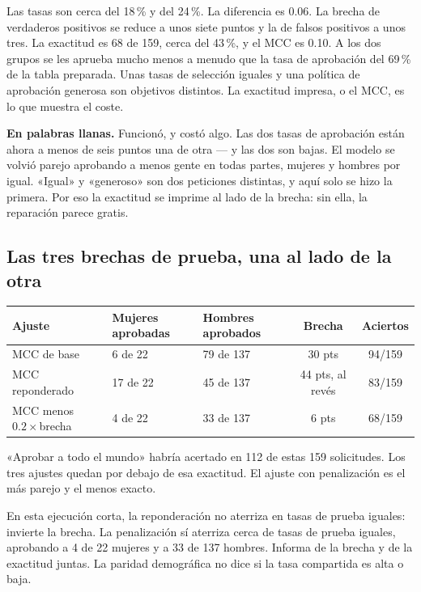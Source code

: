 \documentclass[11pt]{article}
\newcommand{\pct}[1]{\mbox{#1\,\%}}
\begin{document}
Las tasas son cerca del \pct{18} y del \pct{24}. La diferencia es 0.06. La brecha de verdaderos positivos se reduce a unos siete puntos y la de falsos positivos a unos tres. La exactitud es 68 de 159, cerca del \pct{43}, y el MCC es 0.10. A los dos grupos se les aprueba mucho menos a menudo que la tasa de aprobación del \pct{69} de la tabla preparada. Unas tasas de selección iguales y una política de aprobación generosa son objetivos distintos. La exactitud impresa, o el MCC, es lo que muestra el coste.

\begin{plainwords}
\textbf{En palabras llanas.} Funcionó, y costó algo. Las dos tasas de aprobación están ahora a menos de seis puntos una de otra --- y las dos son bajas. El modelo se volvió parejo aprobando a menos gente en todas partes, mujeres y hombres por igual. «Igual» y «generoso» son dos peticiones distintas, y aquí solo se hizo la primera. Por eso la exactitud se imprime al lado de la brecha: sin ella, la reparación parece gratis.
\end{plainwords}

\subsection{Las tres brechas de prueba, una al lado de la otra}

\begin{table}[H]
\centering
\small
\begin{tabularx}{\textwidth}{@{}l Y Y c c@{}}
\toprule
Ajuste & Mujeres aprobadas & Hombres aprobados & Brecha & Aciertos \\
\midrule
MCC de base & 6 de 22 & 79 de 137 & 30 pts & 94/159 \\
MCC reponderado & 17 de 22 & 45 de 137 & 44 pts, al revés & 83/159 \\
MCC menos \(0.2\times\)brecha & 4 de 22 & 33 de 137 & 6 pts & 68/159 \\
\bottomrule
\end{tabularx}
\end{table}

\noindent
«Aprobar a todo el mundo» habría acertado en 112 de estas 159 solicitudes. Los tres ajustes quedan por debajo de esa exactitud. El ajuste con penalización es el más parejo y el menos exacto.

\begin{lesson}
En esta ejecución corta, la reponderación no aterriza en tasas de prueba iguales: invierte la brecha. La penalización sí aterriza cerca de tasas de prueba iguales, aprobando a 4 de 22 mujeres y a 33 de 137 hombres. Informa de la brecha y de la exactitud juntas. La paridad demográfica no dice si la tasa compartida es alta o baja.
\end{lesson}
\end{document}
